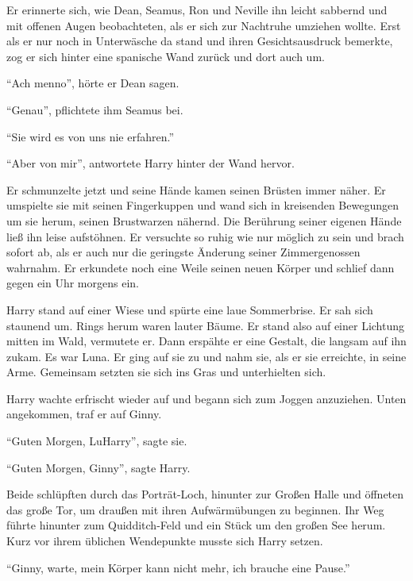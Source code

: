 \begin{rueckblick}
Er erinnerte sich, wie Dean, Seamus, Ron und Neville ihn leicht sabbernd und mit offenen Augen beobachteten, als er sich zur Nachtruhe umziehen wollte. Erst als er nur noch in Unterwäsche da stand und ihren Gesichtsausdruck bemerkte, zog er sich hinter eine spanische Wand zurück und dort auch um.

\enquote{Ach menno}, hörte er Dean sagen.

\enquote{Genau}, pflichtete ihm Seamus bei.

\enquote{Sie wird es von uns nie erfahren.}

\enquote{Aber von mir}, antwortete Harry hinter der Wand hervor.
\end{rueckblick}

Er schmunzelte jetzt und seine Hände kamen seinen Brüsten immer näher. Er umspielte sie mit seinen Fingerkuppen und wand sich in kreisenden Bewegungen um sie herum, seinen Brustwarzen nähernd. Die Berührung seiner eigenen Hände ließ ihn leise aufstöhnen. Er versuchte so ruhig wie nur möglich zu sein und brach sofort ab, als er auch nur die geringste Änderung seiner Zimmergenossen wahrnahm. Er erkundete noch eine Weile seinen neuen Körper und schlief dann gegen ein Uhr morgens ein.

\begin{traum}
Harry stand auf einer Wiese und spürte eine laue Sommerbrise. Er sah sich staunend um. Rings herum waren lauter Bäume. Er stand also auf einer Lichtung mitten im Wald, vermutete er. Dann erspähte er eine Gestalt, die langsam auf ihn zukam. Es war Luna. Er ging auf sie zu und nahm sie, als er sie erreichte, in seine Arme. Gemeinsam setzten sie sich ins Gras und unterhielten sich.
\end{traum}

Harry wachte erfrischt wieder auf und begann sich zum Joggen anzuziehen. Unten angekommen, traf er auf Ginny.

\enquote{Guten Morgen, Lu\aabs Harry}, sagte sie.

\enquote{Guten Morgen, Ginny}, sagte Harry.

Beide schlüpften durch das Porträt-Loch, hinunter zur Großen Halle und öffneten das große Tor, um draußen mit ihren Aufwärmübungen zu beginnen. Ihr Weg führte hinunter zum Quidditch-Feld und ein Stück um den großen See herum. Kurz vor ihrem üblichen Wendepunkte musste sich Harry setzen.

\enquote{Ginny, warte, mein Körper kann nicht mehr, ich brauche eine Pause.}

